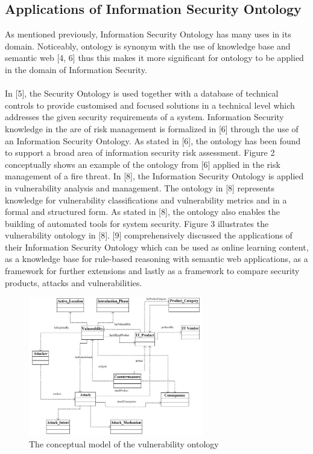 \documentclass[conference, compsoc]{IEEEtran}
\begin{document}
\subsection{Applications of Information Security Ontology}
As mentioned previously, Information Security Ontology has many uses in its domain. Noticeably, ontology is synonym with the use of knowledge base and semantic web [4, 6] thus this makes it more significant for ontology to be applied in the domain of Information Security.
\\
\\
In [5], the Security Ontology is used together with a database of technical controls to provide customised and focused solutions in a technical level which addresses the given security requirements of a system. Information Security knowledge in the are of risk management is formalized in [6] through the use of an Information Security Ontology. As stated in [6], the ontology has been found to support a broad area of information security risk assessment. Figure 2 conceptually shows an example of the ontology from [6] applied in the risk management of a fire threat. In [8], the Information Security Ontology is applied in vulnerability analysis and management. The ontology in [8] represents knowledge for vulnerability classifications and vulnerability metrics and in a formal and structured form. As stated in [8], the ontology also enables the building of automated tools for system security. Figure 3 illustrates the vulnerability ontology in [8]. [9] comprehensively discussed the applications of their Information Security Ontology which can be used as online learning content, as a knowledge base for rule-based reasoning with semantic web applications, as a framework for further extensions and lastly as a framework to compare security products, attacks and vulnerabilities.

\begin{figure}[!t]
\centering
\includegraphics[width=3.0in]{ovm}
\caption{The conceptual model of the vulnerability ontology}
\label{ovm}
\end{figure}
\end{document}
